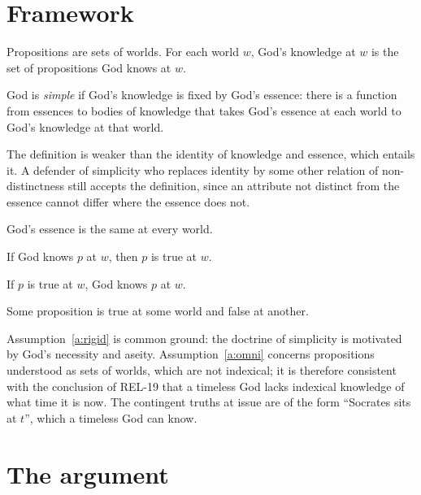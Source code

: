 \documentclass{situationist-preprint}
\begin{document}
\section{Framework}

Propositions are sets of worlds. For each world $w$, God's knowledge at $w$ is the set of propositions God knows at $w$.

\begin{definition}\label{d:simple}
God is \emph{simple} if God's knowledge is fixed by God's essence: there is a function from essences to bodies of knowledge that takes God's essence at each world to God's knowledge at that world.
\end{definition}

The definition is weaker than the identity of knowledge and essence, which entails it. A defender of simplicity who replaces identity by some other relation of non-distinctness still accepts the definition, since an attribute not distinct from the essence cannot differ where the essence does not.

\begin{assumption}\label{a:rigid}
God's essence is the same at every world.
\end{assumption}

\begin{assumption}\label{a:factive}
If God knows $p$ at $w$, then $p$ is true at $w$.
\end{assumption}

\begin{assumption}\label{a:omni}
If $p$ is true at $w$, God knows $p$ at $w$.
\end{assumption}

\begin{assumption}\label{a:contingent}
Some proposition is true at some world and false at another.
\end{assumption}

Assumption~\ref{a:rigid} is common ground: the doctrine of simplicity is motivated by God's necessity and aseity. Assumption~\ref{a:omni} concerns propositions understood as sets of worlds, which are not indexical; it is therefore consistent with the conclusion of REL-19 that a timeless God lacks indexical knowledge of what time it is now. The contingent truths at issue are of the form \enquote{Socrates sits at $t$}, which a timeless God can know.

\section{The argument}
\end{document}
